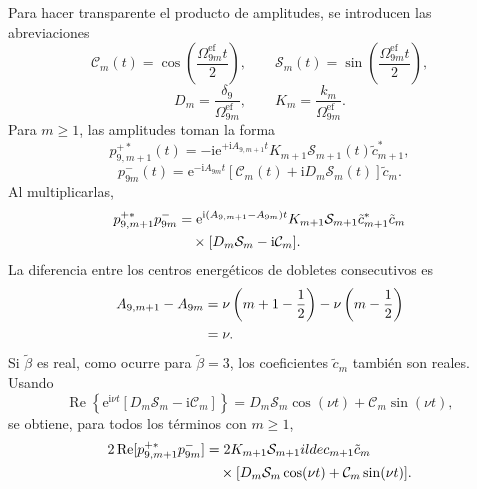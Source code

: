 \documentclass[11pt]{article}
\newcommand{\ii}{\mathrm{i}}
\newcommand{\ee}{\mathrm{e}}
\begin{document}
Para hacer transparente el producto de amplitudes, se introducen las
abreviaciones
\begin{equation}
  \mathcal C_m(t)
  =
  \cos\left(\frac{\Omega_{9m}^{\mathrm{ef}}t}{2}\right),
  \qquad
  \mathcal S_m(t)
  =
  \sin\left(\frac{\Omega_{9m}^{\mathrm{ef}}t}{2}\right),
\end{equation}
\begin{equation}
  D_m=\frac{\delta_9}{\Omega_{9m}^{\mathrm{ef}}},
  \qquad
  K_m=\frac{k_m}{\Omega_{9m}^{\mathrm{ef}}}.
\end{equation}
Para $m\geq1$, las amplitudes toman la forma
\begin{equation}
  p_{9,m+1}^{+*}(t)
  =
  -\ii\ee^{+\ii A_{9,m+1}t}
  K_{m+1}\mathcal S_{m+1}(t)\tilde c_{m+1}^*,
\end{equation}
\begin{equation}
  p_{9m}^-(t)
  =
  \ee^{-\ii A_{9m}t}
  [\mathcal C_m(t)+\ii D_m\mathcal S_m(t)]\tilde c_m.
\end{equation}
Al multiplicarlas,
\begin{align}
  p_{9,m+1}^{+*}p_{9m}^-
  &=
  \ee^{\ii(A_{9,m+1}-A_{9m})t}
  K_{m+1}\mathcal S_{m+1}
  \tilde c_{m+1}^*\tilde c_m
  \notag\\
  &\quad\times
  [D_m\mathcal S_m-\ii\mathcal C_m].
\end{align}
La diferencia entre los centros energ\'eticos de dobletes consecutivos es
\begin{align}
  A_{9,m+1}-A_{9m}
  &=
  \nu\left(m+1-\frac12\right)
  -\nu\left(m-\frac12\right)
  \notag\\
  &=\nu.
\end{align}
Si $\tilde\beta$ es real, como ocurre para $\tilde\beta=3$, los coeficientes
$\tilde c_m$ tambi\'en son reales. Usando
\begin{equation}
  \operatorname{Re}
  \left\{
  \ee^{\ii\nu t}
  [D_m\mathcal S_m-\ii\mathcal C_m]
  \right\}
  =
  D_m\mathcal S_m\cos(\nu t)
  +\mathcal C_m\sin(\nu t),
\end{equation}
se obtiene, para todos los t\'erminos con $m\geq1$,
\begin{align}
  2\operatorname{Re}
  [p_{9,m+1}^{+*}p_{9m}^-]
  &={}
  2K_{m+1}\mathcal S_{m+1}	ilde c_{m+1}\tilde c_m
  \notag\\
  &\quad\times
  [D_m\mathcal S_m\cos(\nu t)
  +\mathcal C_m\sin(\nu t)].
\end{align}
\end{document}

